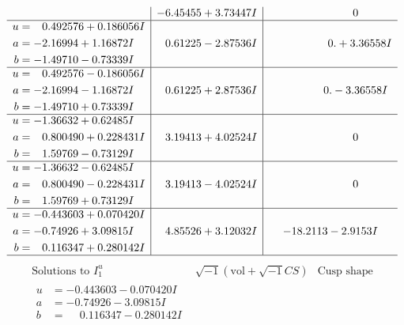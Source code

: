 \documentclass[1p]{elsarticle_modified}
\theoremstyle{definition}
\newcommand{\I}{\sqrt{-1}}
\begin{document}
$$\begin{array}{c|c|c}
 & -6.45455 + 3.73447 I & \phantom{-0.000000 } 0 \\ \hline\begin{aligned}
u &= \phantom{-}0.492576 + 0.186056 I \\
a &= -2.16994 + 1.16872 I \\
b &= -1.49710 - 0.73339 I\end{aligned}
 & \phantom{-}0.61225 - 2.87536 I & \phantom{-0.000000 -}0. + 3.36558 I \\ \hline\begin{aligned}
u &= \phantom{-}0.492576 - 0.186056 I \\
a &= -2.16994 - 1.16872 I \\
b &= -1.49710 + 0.73339 I\end{aligned}
 & \phantom{-}0.61225 + 2.87536 I & \phantom{-0.000000 } 0. - 3.36558 I \\ \hline\begin{aligned}
u &= -1.36632 + 0.62485 I \\
a &= \phantom{-}0.800490 + 0.228431 I \\
b &= \phantom{-}1.59769 - 0.73129 I\end{aligned}
 & \phantom{-}3.19413 + 4.02524 I & \phantom{-0.000000 } 0 \\ \hline\begin{aligned}
u &= -1.36632 - 0.62485 I \\
a &= \phantom{-}0.800490 - 0.228431 I \\
b &= \phantom{-}1.59769 + 0.73129 I\end{aligned}
 & \phantom{-}3.19413 - 4.02524 I & \phantom{-0.000000 } 0 \\ \hline\begin{aligned}
u &= -0.443603 + 0.070420 I \\
a &= -0.74926 + 3.09815 I \\
b &= \phantom{-}0.116347 + 0.280142 I\end{aligned}
 & \phantom{-}4.85526 + 3.12032 I & -18.2113 - 2.9153 I\\
 \hline 
 \end{array}$$\newpage$$\begin{array}{c|c|c}  
\text{Solutions to }I^u_{1}& \I (\text{vol} + \sqrt{-1}CS) & \text{Cusp shape}\\
 \hline 
\begin{aligned}
u &= -0.443603 - 0.070420 I \\
a &= -0.74926 - 3.09815 I \\
b &= \phantom{-}0.116347 - 0.280142 I\end{aligned}

\end{array}$$
\end{document}
